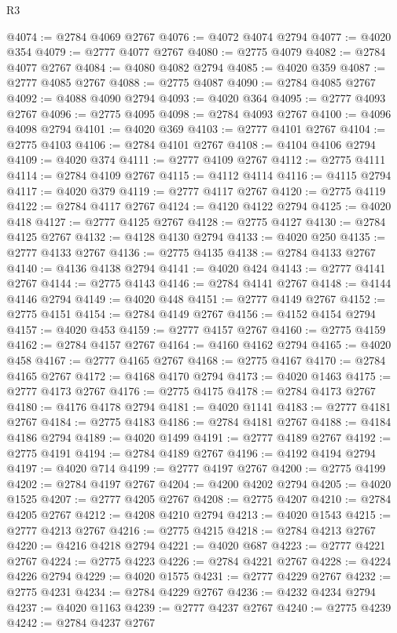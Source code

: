 \begin{lexlean}{R3}
\begin{coremodule}
@4074 := @2784 @4069 @2767
@4076 := @4072 @4074 @2794
@4077 := @4020 @354
@4079 := @2777 @4077 @2767
@4080 := @2775 @4079
@4082 := @2784 @4077 @2767
@4084 := @4080 @4082 @2794
@4085 := @4020 @359
@4087 := @2777 @4085 @2767
@4088 := @2775 @4087
@4090 := @2784 @4085 @2767
@4092 := @4088 @4090 @2794
@4093 := @4020 @364
@4095 := @2777 @4093 @2767
@4096 := @2775 @4095
@4098 := @2784 @4093 @2767
@4100 := @4096 @4098 @2794
@4101 := @4020 @369
@4103 := @2777 @4101 @2767
@4104 := @2775 @4103
@4106 := @2784 @4101 @2767
@4108 := @4104 @4106 @2794
@4109 := @4020 @374
@4111 := @2777 @4109 @2767
@4112 := @2775 @4111
@4114 := @2784 @4109 @2767
@4115 := @4112 @4114
@4116 := @4115 @2794
@4117 := @4020 @379
@4119 := @2777 @4117 @2767
@4120 := @2775 @4119
@4122 := @2784 @4117 @2767
@4124 := @4120 @4122 @2794
@4125 := @4020 @418
@4127 := @2777 @4125 @2767
@4128 := @2775 @4127
@4130 := @2784 @4125 @2767
@4132 := @4128 @4130 @2794
@4133 := @4020 @250
@4135 := @2777 @4133 @2767
@4136 := @2775 @4135
@4138 := @2784 @4133 @2767
@4140 := @4136 @4138 @2794
@4141 := @4020 @424
@4143 := @2777 @4141 @2767
@4144 := @2775 @4143
@4146 := @2784 @4141 @2767
@4148 := @4144 @4146 @2794
@4149 := @4020 @448
@4151 := @2777 @4149 @2767
@4152 := @2775 @4151
@4154 := @2784 @4149 @2767
@4156 := @4152 @4154 @2794
@4157 := @4020 @453
@4159 := @2777 @4157 @2767
@4160 := @2775 @4159
@4162 := @2784 @4157 @2767
@4164 := @4160 @4162 @2794
@4165 := @4020 @458
@4167 := @2777 @4165 @2767
@4168 := @2775 @4167
@4170 := @2784 @4165 @2767
@4172 := @4168 @4170 @2794
@4173 := @4020 @1463
@4175 := @2777 @4173 @2767
@4176 := @2775 @4175
@4178 := @2784 @4173 @2767
@4180 := @4176 @4178 @2794
@4181 := @4020 @1141
@4183 := @2777 @4181 @2767
@4184 := @2775 @4183
@4186 := @2784 @4181 @2767
@4188 := @4184 @4186 @2794
@4189 := @4020 @1499
@4191 := @2777 @4189 @2767
@4192 := @2775 @4191
@4194 := @2784 @4189 @2767
@4196 := @4192 @4194 @2794
@4197 := @4020 @714
@4199 := @2777 @4197 @2767
@4200 := @2775 @4199
@4202 := @2784 @4197 @2767
@4204 := @4200 @4202 @2794
@4205 := @4020 @1525
@4207 := @2777 @4205 @2767
@4208 := @2775 @4207
@4210 := @2784 @4205 @2767
@4212 := @4208 @4210 @2794
@4213 := @4020 @1543
@4215 := @2777 @4213 @2767
@4216 := @2775 @4215
@4218 := @2784 @4213 @2767
@4220 := @4216 @4218 @2794
@4221 := @4020 @687
@4223 := @2777 @4221 @2767
@4224 := @2775 @4223
@4226 := @2784 @4221 @2767
@4228 := @4224 @4226 @2794
@4229 := @4020 @1575
@4231 := @2777 @4229 @2767
@4232 := @2775 @4231
@4234 := @2784 @4229 @2767
@4236 := @4232 @4234 @2794
@4237 := @4020 @1163
@4239 := @2777 @4237 @2767
@4240 := @2775 @4239
@4242 := @2784 @4237 @2767

\end{coremodule}
\end{lexlean}
